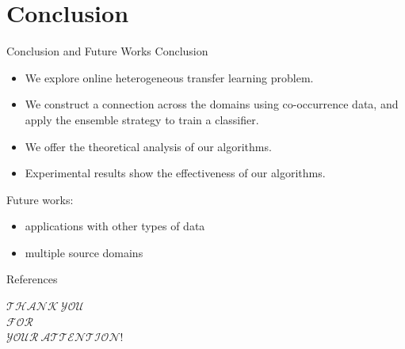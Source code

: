 \documentclass{beamer}
\begin{document}
\section{Conclusion}
\begin{frame}{Conclusion and Future Works}
Conclusion
\begin{itemize}
\item
We explore online heterogeneous transfer learning problem.
\item
We construct a connection across the domains using co-occurrence data, and apply the ensemble strategy to train a classifier.
\item
We offer the theoretical analysis of our algorithms.
\item
Experimental results show the effectiveness of our algorithms.
\end{itemize}
Future works:
\begin{itemize}
\item
applications with other types of data
\item
multiple source domains
\end{itemize}
\end{frame}

\begin{frame}[allowframebreaks]{References}
\tiny


\end{frame}

\begin{frame}{}{}
\begin{center}
\begin{Huge}
$ \mathcal{THANK \ YOU}$ \\
$ \mathcal{FOR} $ \\
$ \mathcal{YOUR \ ATTENTION!}$ \\
\end{Huge}
\end{center}
\end{frame}
\end{document}
